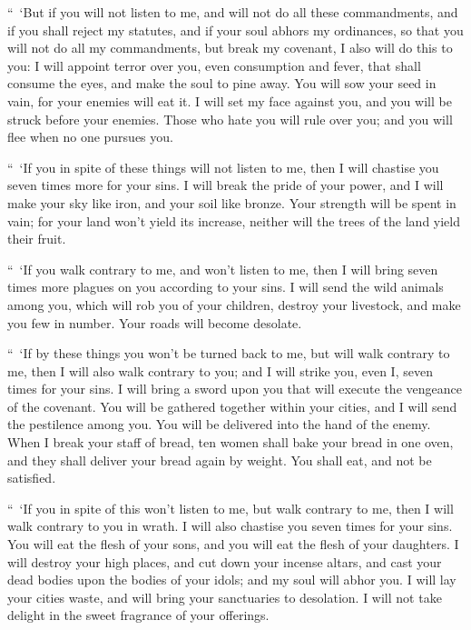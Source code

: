 {\par }{\PP {}“ ‘But if you will not listen to me, and will not do all these commandments,
and if you shall reject my statutes, and if your soul abhors my ordinances, so that you will not do all my commandments, but break my covenant,
I also will do this to you: I will appoint terror over you, even consumption and fever, that shall consume the eyes, and make the soul to pine away. You will sow your seed in vain, for your enemies will eat it.
I will set my face against you, and you will be struck before your enemies. Those who hate you will rule over you; and you will flee when no one pursues you.
\par }{\PP {}“ ‘If you in spite of these things will not listen to me, then I will chastise you seven times more for your sins.
I will break the pride of your power, and I will make your sky like iron, and your soil like bronze.
Your strength will be spent in vain; for your land won’t yield its increase, neither will the trees of the land yield their fruit.
\par }{\PP {}“ ‘If you walk contrary to me, and won’t listen to me, then I will bring seven times more plagues on you according to your sins.
I will send the wild animals among you, which will rob you of your children, destroy your livestock, and make you few in number. Your roads will become desolate.
\par }{\PP {}“ ‘If by these things you won’t be turned back to me, but will walk contrary to me,
then I will also walk contrary to you; and I will strike you, even I, seven times for your sins.
I will bring a sword upon you that will execute the vengeance of the covenant. You will be gathered together within your cities, and I will send the pestilence among you. You will be delivered into the hand of the enemy.
When I break your staff of bread, ten women shall bake your bread in one oven, and they shall deliver your bread again by weight. You shall eat, and not be satisfied.
\par }{\PP {}“ ‘If you in spite of this won’t listen to me, but walk contrary to me,
then I will walk contrary to you in wrath. I will also chastise you seven times for your sins.
You will eat the flesh of your sons, and you will eat the flesh of your daughters.
I will destroy your high places, and cut down your incense altars, and cast your dead bodies upon the bodies of your idols; and my soul will abhor you.
I will lay your cities waste, and will bring your sanctuaries to desolation. I will not take delight in the sweet fragrance of your offerings.
}
